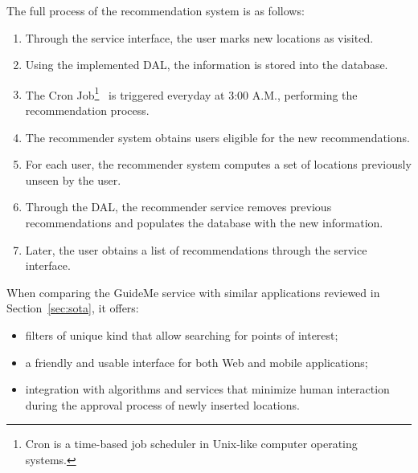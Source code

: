The full process of the recommendation system is as follows:
\begin{enumerate}
\item Through the service interface, the user marks new locations as visited.
\item Using the implemented DAL, the information is stored into the database.
\item The Cron Job\footnote{Cron is a time-based job scheduler in Unix-like computer operating systems.}~\cite{cronTab} is triggered everyday at 3:00 A.M., performing the recommendation process.
\item The recommender system obtains users eligible for the new recommendations.
\item For each user, the recommender system computes a set of locations previously unseen by the user.
\item Through the DAL, the recommender service removes previous recommendations and populates the database with the new information.
\item Later, the user obtains a list of recommendations through the service interface.
\end{enumerate}
When comparing the GuideMe service with similar applications reviewed in Section~\ref{sec:sota}, it offers:
\begin{itemize}
	\item filters of unique kind that allow searching for points of interest;
	\item a friendly and usable interface for both Web and mobile applications;
	\item integration with algorithms and services that minimize human interaction during the approval process of newly inserted locations.
\end{itemize}

